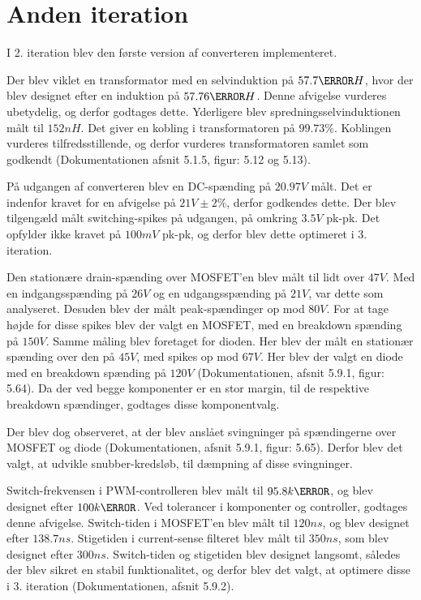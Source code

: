 
\section{Anden iteration}
I 2. iteration blev den første version af converteren implementeret.

\noindent Der blev viklet en transformator med en selvinduktion på $57.7\micro H$, hvor der blev designet efter en induktion på $57.76\micro H$. Denne afvigelse vurderes ubetydelig, og derfor godtages dette. Yderligere blev spredningsselvinduktionen målt til $152nH$. Det giver en kobling i transformatoren på $99.73\percent$. Koblingen vurderes tilfredsstillende, og derfor vurderes transformatoren samlet som godkendt (Dokumentationen afsnit 5.1.5, figur: 5.12 og 5.13). 

På udgangen af converteren blev en DC-spænding på $20.97V$ målt. Det er indenfor kravet for en afvigelse på $21V \pm2\percent$, derfor godkendes dette. Der blev tilgengæld målt switching-spikes på udgangen, på omkring $3.5V$ pk-pk. Det opfylder ikke kravet på $100mV$ pk-pk, og derfor blev dette optimeret i 3. iteration. 

Den stationære drain-spænding over MOSFET'en blev målt til lidt over $47V$. Med en indgangsspænding på $26V$ og en udgangsspænding på $21V$, var dette som analyseret. Desuden blev der målt peak-spændinger op mod $80V$. For at tage højde for disse spikes blev der valgt en MOSFET, med en breakdown spænding på $150V$. Samme måling blev foretaget for dioden. Her blev der målt en stationær spænding over den på $45V$, med spikes op mod $67V$. Her blev der valgt en diode med en breakdown spænding på $120V$ (Dokumentationen, afsnit 5.9.1, figur: 5.64). Da der ved begge komponenter er en stor margin, til de respektive breakdown spændinger, godtages disse komponentvalg.

Der blev dog observeret, at der blev anslået svingninger på spændingerne over MOSFET og diode (Dokumentationen, afsnit 5.9.1, figur: 5.65). Derfor blev det valgt, at udvikle snubber-kredsløb, til dæmpning af disse svingninger. 

Switch-frekvensen i PWM-controlleren blev målt til $95.8k\hertz$, og blev designet efter $100k\hertz$. Ved tolerancer i komponenter og controller, godtages denne afvigelse. Switch-tiden i MOSFET'en blev målt til $120ns$, og blev designet efter $138.7ns$. Stigetiden i current-sense filteret blev målt til $350ns$, som blev designet efter $300ns$. Switch-tiden og stigetiden blev designet langsomt, således der blev sikret en stabil funktionalitet, og derfor blev det valgt, at optimere disse i 3. iteration (Dokumentationen, afsnit 5.9.2). 

